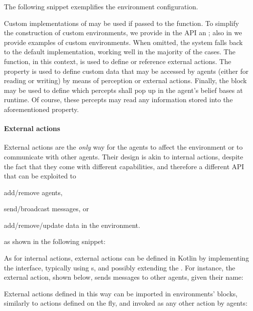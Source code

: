 The following snippet exemplifies the environment configuration.
%

%
Custom implementations of  may be used if passed to the
 function.
%
To simplify the construction of custom environments,
we provide in the \jakta{} \ac{API} an  ;
also in  we provide examples of custom environments.
%
When omitted, the system falls back to the default implementation,
working well in the majority of the cases.
%
The  function, in this context, is used to define or reference external actions.
%
The  property is used to define custom data that may be accessed by agents
(either for reading or writing) by means of perception or external actions.
%
Finally, the  block may be used to define which percepts
shall pop up in the agent's belief bases at runtime.
%
Of course, these percepts may read any information stored into the aforementioned
 property.

\paragraph{External actions}

External actions are the \emph{only} way for the agents to affect the environment
or to communicate with other agents.
%
Their design is akin to internal actions,
despite the fact that they come with different capabilities, and therefore a different \ac{API}
that can be exploited to
\begin{inlinelist}
    \item add/remove agents,
    \item send/broadcast messages,
    or
    \item add/remove/update data in the environment.
\end{inlinelist}
as shown in the following snippet:

%
As for internal actions,
external actions can be defined in Kotlin by implementing the  interface,
typically using s,
and possibly extending the  .
%
For instance, the  external action, shown below, sends messages to other agents, given their name:
%

%
External actions defined in this way can be imported in environments'  blocks,
similarly to actions defined on the fly, and invoked as any other action by agents:
%

%

